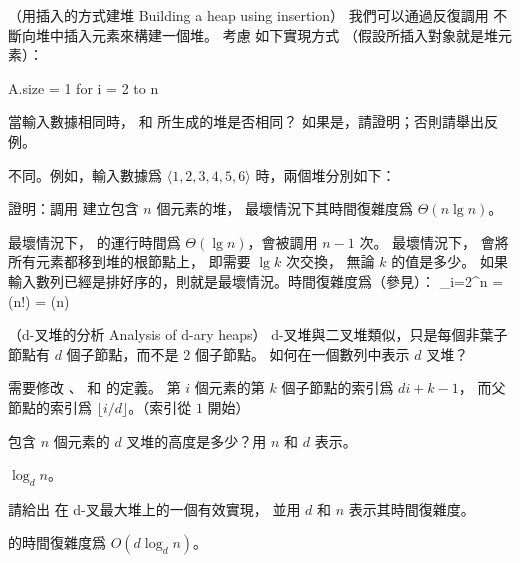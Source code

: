 \startsubject[
  title={Problems},
]

\startPROBLEM
（用插入的方式建堆 Building a heap using insertion）
我們可以通過反復調用  不斷向堆中插入元素來構建一個堆。
考慮  如下實現方式
（假設所插入對象就是堆元素）：

\startCLRSCODE
A.size = 1
for i = 2 to n
\stopCLRSCODE

\startigBase[a]
\startitem
當輸入數據相同時，  和  所生成的堆是否相同？
如果是，請證明；否則請舉出反例。
\stopitem

\startANSWER
不同。例如，輸入數據爲 $\langle 1, 2, 3, 4, 5, 6 \rangle$ 時，兩個堆分別如下：

\startcombination[2*1]
{\externalfigure[p6_1_a-1]}{}
{\externalfigure[p6_1_a-2]}{}
\stopcombination
\stopANSWER

\startitem
證明：調用  建立包含 $n$ 個元素的堆，
最壞情況下其時間復雜度爲 $\Theta(n\lg{n})$。
\stopitem

\startANSWER
最壞情況下，  的運行時間爲 $\Theta(\lg{n})$，會被調用 $n-1$ 次。
最壞情況下，  會將所有元素都移到堆的根節點上， 即需要 $\lg{k}$ 次交換，
無論 $k$ 的值是多少。
如果輸入數列已經是排好序的，則就是最壞情況。時間復雜度爲（參見\inexercise[lg_n_fac]）：
\startformula
\sum_{i=2}^{n} = \lg(n!) = \Theta(n)
\stopformula
\stopANSWER

\stopigBase
\stopPROBLEM

\startPROBLEM[problem:6-2]
（d-叉堆的分析 Analysis of d-ary heaps）
d-叉堆與二叉堆類似，只是每個非葉子節點有 $d$ 個子節點，而不是 2 個子節點。
\startigBase[a]
\startitem
如何在一個數列中表示 $d$ 叉堆？
\stopitem

\startANSWER
需要修改 、  和  的定義。
第 $i$ 個元素的第 $k$ 個子節點的索引爲 $di + k - 1$，
而父節點的索引爲 $\lfloor i/d \rfloor$。（索引從 $1$ 開始）
\stopANSWER

\startitem
包含 $n$ 個元素的 $d$ 叉堆的高度是多少？用 $n$ 和 $d$ 表示。
\stopitem

\startANSWER
$\log_d{n}$。
\stopANSWER

\startitem
請給出  在 d-叉最大堆上的一個有效實現，
並用 $d$ 和 $n$ 表示其時間復雜度。
\stopitem

\startANSWER
{} 的時間復雜度爲 $O(d\log_d{n})$。
\stopANSWER

